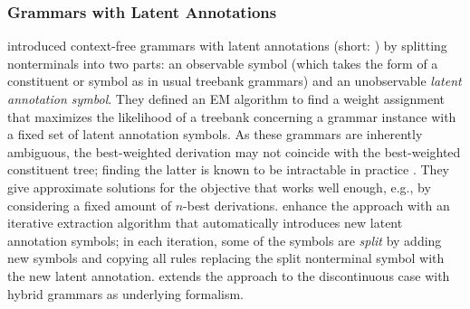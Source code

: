 \documentclass[../document.tex]{subfiles}
\begin{document}
    \subsubsection*{Grammars with Latent Annotations}
     introduced context-free grammars with latent annotations (short: ) by splitting nonterminals into two parts: an observable symbol (which takes the form of a constituent or  symbol as in usual treebank grammars) and an unobservable \emph{latent annotation symbol}.
    They defined an EM algorithm to find a weight assignment that maximizes the likelihood of a treebank concerning a grammar instance with a fixed set of latent annotation symbols.
    As these grammars are inherently ambiguous, the best-weighted derivation may not coincide with the best-weighted constituent tree; finding the latter is known to be intractable in practice \citep[they conclude that finding the best-weighted constituent tree is \emph{NP-hard} in Section~3]{Mat05}.
    They give approximate solutions for the objective that works well enough, e.g.\@, by considering a fixed amount of \(n\)-best derivations.
     enhance the approach with an iterative extraction algorithm that automatically introduces new latent annotation symbols; in each iteration, some of the symbols are \emph{split} by adding new symbols and copying all rules replacing the split nonterminal symbol with the new latent annotation.
     extends the approach to the discontinuous case with hybrid grammars as underlying formalism.
\end{document}
